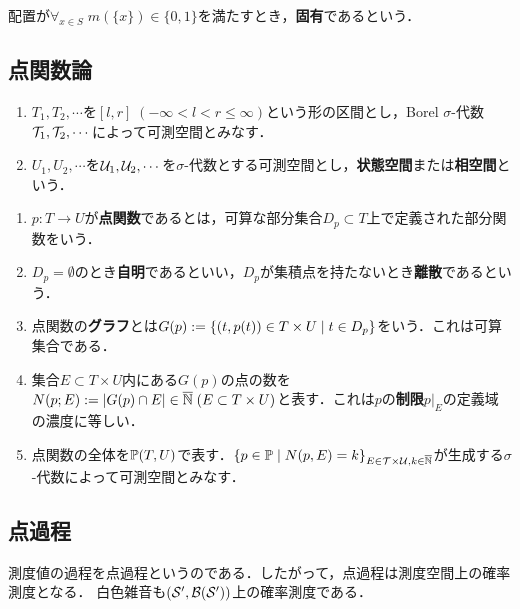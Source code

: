 \documentclass[uplatex,dvipdfmx]{jsreport}
\begin{document}
\begin{definition}
    配置が$\forall_{x\in S}\;m(\{x\})\in\{0,1\}$を満たすとき，\textbf{固有}であるという．
\end{definition}

\subsection{点関数論}

\begin{notation}\mbox{}
    \begin{enumerate}
        \item $T_1,T_2,\cdots$を$[l,r]\;(-\infty<l<r\le\infty)$という形の区間とし，Borel $\sigma$-代数$\mathcal{T}_1,\mathcal{T}_2,\cdots$によって可測空間とみなす．
        \item $U_1,U_2,\cdots$を$\mathcal{U}_1,\mathcal{U}_2,\cdots$を$\sigma$-代数とする可測空間とし，\textbf{状態空間}または\textbf{相空間}という．
    \end{enumerate}
\end{notation}

\begin{definition}\mbox{}
    \begin{enumerate}
        \item $p:T\to U$が\textbf{点関数}であるとは，可算な部分集合$D_p\subset T$上で定義された部分関数をいう．
        \item $D_p=\emptyset$のとき\textbf{自明}であるといい，$D_p$が集積点を持たないとき\textbf{離散}であるという．
        \item 点関数の\textbf{グラフ}とは$G(p):=\left\{(t,p(t))\in T\times U\mid t\in D_p\right\}$をいう．これは可算集合である．
        \item 集合$E\subset T\times U$内にある$G(p)$の点の数を$N(p;E):=\lvert G(p)\cap E\rvert\in\overline{\mathbb{N}}\;(E\subset T\times U)$と表す．これは$p$の\textbf{制限}$p|_E$の定義域の濃度に等しい．
        \item 点関数の全体を$\mathbb{P}(T,U)$で表す．$\{p\in\mathbb{P}\mid N(p,E)=k\}_{E\in\mathcal{T}\times\mathcal{U},k\in\overline{\mathbb{N}}}$が生成する$\sigma$-代数によって可測空間とみなす．
    \end{enumerate}
\end{definition}

\subsection{点過程}

\begin{tcolorbox}[colframe=ForestGreen, colback=ForestGreen!10!white,breakable,colbacktitle=ForestGreen!40!white,coltitle=black,fonttitle=\bfseries\sffamily,
title=]
    測度値の過程を点過程というのである．したがって，点過程は測度空間上の確率測度となる．
    白色雑音も$(\mathcal{S}',\mathcal{B}(\mathcal{S}'))$上の確率測度である．
\end{tcolorbox}
\end{document}

